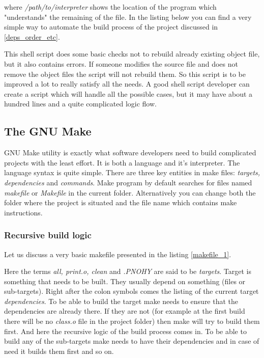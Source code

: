 where \textit { /path/to/interpreter} shows the location of the program which "understands" the remaining of the file. In the listing below you can find a very simple way to automate the build process of the project discussed in \ref{deps_order_etc}.



This shell script does some basic checks not to rebuild already existing object file, but it also contains errors. If someone modifies the source file and does not remove the object files the script will not rebuild them. So this script is to be improved a lot to really satisfy all the needs. A good shell script developer can create a script which will handle all the possible cases, but it may have about a hundred lines and a quite complicated logic flow.

\subsection{The GNU Make}
GNU Make utility is exactly what software developers need to build complicated projects with the least effort. It is both a language and it's interpreter. The language syntax is quite simple. There are three key entities in make files: \textit {targets, dependencies} and \textit {commands}. Make program by default searches for files named \textit {makefile} or \textit {Makefile} in the current folder. Alternatively you can change both the folder where the project is situated and the file name which contains make instructions.

\subsubsection{Recursive build logic}
Let us discuss a very basic makefile presented in the listing \ref{makefile_1}.


Here the terms \textit { all, print.o, clean} and \textit { .PNOHY} are said to be \textit {targets}. Target is something that needs to be built. They usually depend on something (files or sub-targets). Right after the colon symbols comes the listing of the current target \textit{dependencies}. To be able to build the target make needs to ensure that the dependencies are already there. If they are not (for example at the first build there will be no \textit { class.o} file in the project folder) then make will try to build them first. And here the recursive logic of the build process comes in. To be able to build any of the sub-targets make needs to have their dependencies and in case of need it builds them first and so on.

